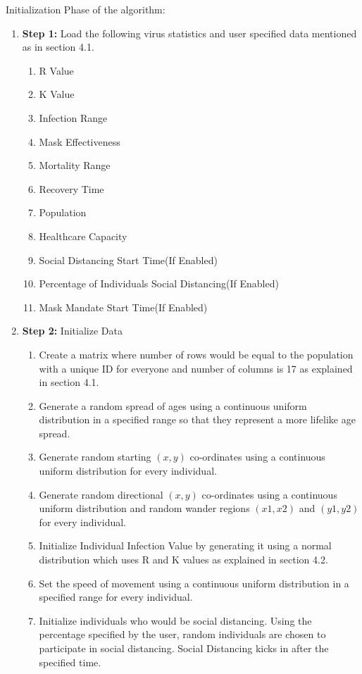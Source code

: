 \documentclass[11pt]{article}
\begin{document}
Initialization Phase of the algorithm: 
\begin{enumerate}[label=\textbf{\arabic*})]
    \item \textbf{Step 1:} Load the following virus statistics and user specified data mentioned as in section 4.1.
    \begin{enumerate}
        \item R Value
        \item K Value
        \item Infection Range
        \item Mask Effectiveness
        \item Mortality Range
        \item Recovery Time
        \item Population
        \item Healthcare Capacity
        \item Social Distancing Start Time(If Enabled)
        \item Percentage of Individuals Social Distancing(If Enabled)
        \item Mask Mandate Start Time(If Enabled)
    \end{enumerate}
    \item \textbf{Step 2:} Initialize Data
    \begin{enumerate}
        \item Create a matrix where number of rows would be equal to the population with a unique ID for everyone and number of columns is 17 as explained in section 4.1.
        \item Generate a random spread of ages using a continuous uniform distribution\cite{uniform_dist} in a specified range so that they represent a more lifelike age spread.
        \item Generate random starting $(x,y)$ co-ordinates using a continuous uniform distribution for every individual.
        \item Generate random directional $(x,y)$ co-ordinates using a continuous uniform distribution and random wander regions $(x1,x2)$ and $(y1,y2)$ for every individual.
        \item Initialize Individual Infection Value by generating it using a normal distribution which uses R and K values as explained in section 4.2.
        \item Set the speed of movement using a continuous uniform distribution in a specified range for every individual.
        \item Initialize individuals who would be social distancing. Using the percentage specified by the user, random individuals are chosen to participate in social distancing. Social Distancing kicks in after the specified time.

\end{enumerate}
\end{enumerate}
\end{document}
